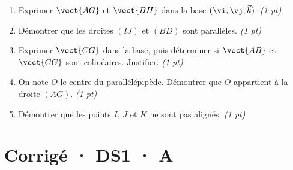 \begin{enumerate}

\item Exprimer $\vect{AG}$ et $\vect{BH}$ dans la base $(\vi,\vj,\vec k)$. \hfill\textit{(1 pt)}

\item Démontrer que les droites $(IJ)$ et $(BD)$ sont parallèles. \hfill\textit{(1 pt)}

\item Exprimer $\vect{CG}$ dans la base, puis déterminer si $\vect{AB}$ et $\vect{CG}$ sont colinéaires. Justifier. \hfill\textit{(1 pt)}

\item On note $O$ le centre du parallélépipède. Démontrer que $O$ appartient à la droite $(AG)$. \hfill\textit{(1 pt)}

\item Démontrer que les points $I$, $J$ et $K$ ne sont pas alignés. \hfill\textit{(1 pt)}

\end{enumerate}

\ifprof\clearpage

\section*{Corrigé · DS1 · A}\label{cor:1-3}

